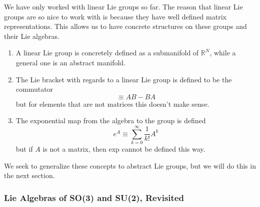 \documentclass{article}
\begin{document}
    We have only worked with linear Lie groups so far. The reason that linear Lie groups are so nice to work with is because they have well defined matrix representations. This allows us to have concrete structures on these groups and their Lie algebras. 
    \begin{enumerate}
      \item A linear Lie group is concretely defined as a submanifold of $\mathbb{R}^N$, while a general one is an abstract manifold. 
      \item The Lie bracket with regards to a linear Lie group is defined to be the commutator 
        \begin{equation}
          [A,B] \equiv A B - B A
        \end{equation}
      but for elements that are not matrices this doesn't make sense. 

      \item The exponential map from the algebra to the group is defined
        \begin{equation}
          e^A \equiv \sum_{k=0}^\infty \frac{1}{k!} A^k
        \end{equation}
      but if $A$ is not a matrix, then exp cannot be defined this way.
    \end{enumerate}
    We seek to generalize these concepts to abstract Lie groups, but we will do this in the next section. 

    \subsubsection{Lie Algebras of SO(3) and SU(2), Revisited}
\end{document}

